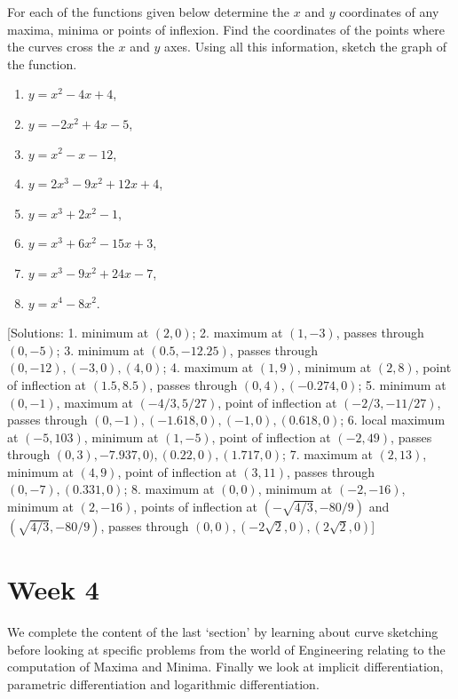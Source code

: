 \documentclass[
  11pt,
  oneside]{book}
\providecommand{\tightlist}{%
  \setlength{\itemsep}{0pt}\setlength{\parskip}{0pt}}
\newcommand{\slide}{}
\theoremstyle{definition}
\theoremstyle{definition}
\theoremstyle{definition}
\theoremstyle{definition}
\theoremstyle{remark}
\begin{document}
For each of the functions given below determine the \(x\) and \(y\) coordinates of any maxima, minima or points of inflexion. Find the coordinates of the points where the curves cross the \(x\) and \(y\) axes. Using all this information, sketch the graph of the function.

\begin{enumerate}
\def\labelenumi{\arabic{enumi}.}
\tightlist
\item
  \(y=x^2-4x+4\),
\item
  \(y=-2x^2+4x-5\),
\item
  \(y=x^2-x-12\),
\item
  \(y=2x^3-9x^2+12x+4\),
\item
  \(y=x^3+2x^2-1\),
\item
  \(y=x^3+6x^2-15x+3\),
\item
  \(y=x^3-9x^2+24x-7\),
\item
  \(y=x^4-8x^2\).
\end{enumerate}

{[}Solutions: 1. minimum at \((2,0)\); 2. maximum at \((1,-3)\), passes through \((0,-5)\); 3. minimum at \((0.5,-12.25)\), passes through \((0,-12), (-3,0), (4,0)\); 4. maximum at \((1,9)\), minimum at \((2,8)\), point of inflection at \((1.5,8.5)\), passes through \((0,4), (-0.274,0)\); 5. minimum at \((0,-1)\), maximum at \((-4/3,5/27)\), point of inflection at \((-2/3,-11/27)\), passes through \((0,-1), (-1.618,0), (-1,0), (0.618,0)\); 6. local maximum at \((-5,103)\), minimum at \((1,-5)\), point of inflection at \((-2,49)\), passes through \((0,3), -7.937,0), (0.22,0), (1.717,0)\); 7. maximum at \((2,13)\), minimum at \((4,9)\), point of inflection at \((3,11)\), passes through \((0,-7), (0.331,0)\); 8. maximum at \((0,0)\), minimum at \((-2,-16)\), minimum at \((2,-16)\), points of inflection at \((-\sqrt{4/3},-80/9)\) and \((\sqrt{4/3},-80/9)\), passes through \((0,0), (-2\sqrt{2},0), (2\sqrt{2},0)\){]}

\chapter{Week 4}\label{week-four}

We complete the content of the last `section' by learning about curve sketching before looking at specific problems from the world of Engineering relating to the computation of Maxima and Minima. Finally we look at implicit differentiation, parametric differentiation and logarithmic differentiation.

\slide
\end{document}
